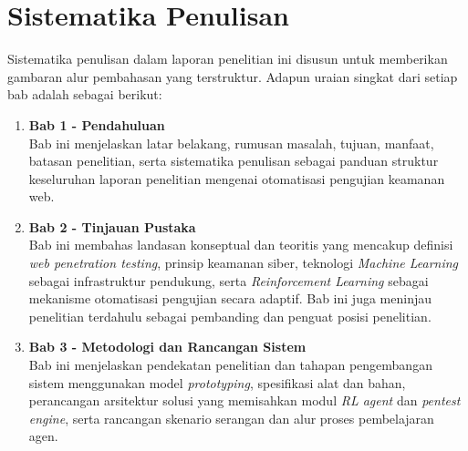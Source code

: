 \section{Sistematika Penulisan}

Sistematika penulisan dalam laporan penelitian ini disusun untuk memberikan gambaran alur pembahasan yang terstruktur. Adapun uraian singkat dari setiap bab adalah sebagai berikut:

\begin{enumerate}
    \item \textbf{Bab 1 - Pendahuluan} \\
    Bab ini menjelaskan latar belakang, rumusan masalah, tujuan, manfaat, batasan penelitian, serta sistematika penulisan sebagai panduan struktur keseluruhan laporan penelitian mengenai otomatisasi pengujian keamanan web.

    \item \textbf{Bab 2 - Tinjauan Pustaka} \\
    Bab ini membahas landasan konseptual dan teoritis yang mencakup definisi \textit{web penetration testing}, prinsip keamanan siber, teknologi \textit{Machine Learning} sebagai infrastruktur pendukung, serta \textit{Reinforcement Learning} sebagai mekanisme otomatisasi pengujian secara adaptif. Bab ini juga meninjau penelitian terdahulu sebagai pembanding dan penguat posisi penelitian.

    \item \textbf{Bab 3 - Metodologi dan Rancangan Sistem} \\
    Bab ini menjelaskan pendekatan penelitian dan tahapan pengembangan sistem menggunakan model \textit{prototyping}, spesifikasi alat dan bahan, perancangan arsitektur solusi yang memisahkan modul \textit{RL agent} dan \textit{pentest engine}, serta rancangan skenario serangan dan alur proses pembelajaran agen.
\end{enumerate}
